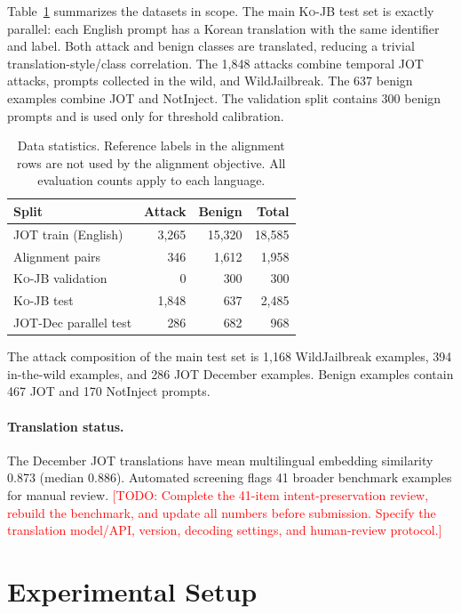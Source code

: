 \documentclass[10pt,twocolumn]{article}
\newcommand{\todo}[1]{\textcolor{red}{[TODO: #1]}}
\newcommand{\dataset}{\textsc{Ko-JB}}
\begin{document}
Table~\ref{tab:data} summarizes the datasets in scope. The main \dataset{}
test set is exactly parallel: each English prompt has a Korean translation with
the same identifier and label. Both attack and benign classes are translated,
reducing a trivial translation-style/class correlation. The 1,848 attacks
combine temporal JOT attacks, prompts collected in the wild, and WildJailbreak.
The 637 benign examples combine JOT and NotInject. The validation split contains
300 benign prompts and is used only for threshold calibration.

\begin{table}[t]
\centering
\small
\begin{tabular}{lrrr}
\toprule
Split & Attack & Benign & Total \\
\midrule
JOT train (English) & 3,265 & 15,320 & 18,585 \\
Alignment pairs & 346 & 1,612 & 1,958 \\
\midrule
\dataset{} validation & 0 & 300 & 300 \\
\dataset{} test & 1,848 & 637 & 2,485 \\
JOT-Dec parallel test & 286 & 682 & 968 \\
\bottomrule
\end{tabular}
\caption{Data statistics. Reference labels in the alignment rows are not used
by the alignment objective. All evaluation counts apply to each language.}
\label{tab:data}
\end{table}

The attack composition of the main test set is 1,168 WildJailbreak examples,
394 in-the-wild examples, and 286 JOT December examples. Benign examples contain
467 JOT and 170 NotInject prompts.

\paragraph{Translation status.}
The December JOT translations have mean multilingual embedding similarity
0.873 (median 0.886). Automated screening flags 41 broader benchmark examples
for manual review. \todo{Complete the 41-item intent-preservation review,
rebuild the benchmark, and update all numbers before submission. Specify the
translation model/API, version, decoding settings, and human-review protocol.}

\section{Experimental Setup}
\end{document}
